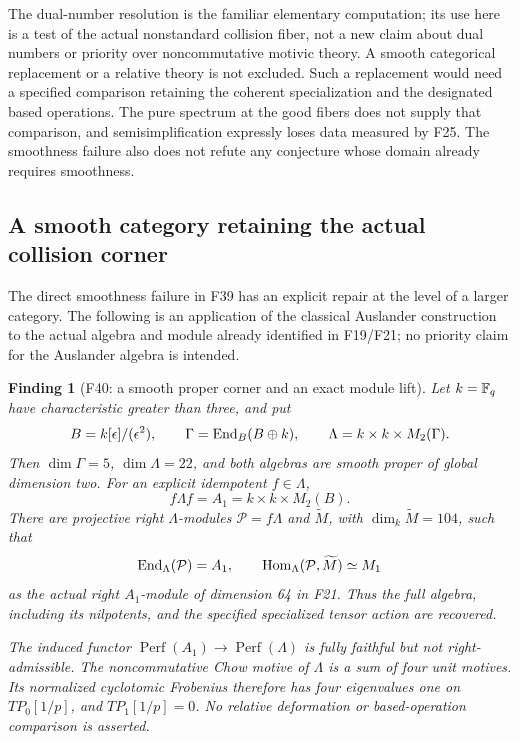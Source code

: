 \documentclass[11pt,a4paper]{article}
\newcommand{\fid}[1]{\textsf{#1}}\newcommand{\gate}[1]{\textsf{#1}}
\theoremstyle{named}\newtheorem{finding}{Finding}[section]
\theoremstyle{definition}\newtheorem{definition}[finding]{Definition}
\theoremstyle{remark}\newtheorem{remark}[finding]{Remark}
\begin{document}
The dual-number resolution is the familiar elementary computation;
its use here is a test of the actual nonstandard collision fiber,
not a new claim about dual numbers or priority over noncommutative
motivic theory. A smooth categorical replacement or a relative theory
is not excluded. Such a replacement would need a specified comparison
retaining the coherent specialization and the designated based
operations. The pure spectrum at the good fibers does not supply
that comparison, and semisimplification expressly loses data measured
by \fid{F25}. The smoothness failure also does not refute any
conjecture whose domain already requires smoothness.

\subsection{A smooth category retaining the actual collision corner}
The direct smoothness failure in \fid{F39} has an explicit repair
at the level of a larger category. The following is an application
of the classical Auslander construction to the actual algebra and
module already identified in \fid{F19}/\fid{F21}; no priority claim
for the Auslander algebra is intended.

\begin{finding}[\fid{F40}: a smooth proper corner and an exact module lift]\label{f:auslander}
Let $k=\mathbb F_q$ have characteristic greater than three, and put
\[
 B=k[\epsilon]/(\epsilon^2),\qquad
 \Gamma=\operatorname{End}_B(B\oplus k),\qquad
 \Lambda=k\times k\times M_2(\Gamma).
\]
Then $\dim\Gamma=5$, $\dim\Lambda=22$, and both algebras are
smooth proper of global dimension two. For an explicit idempotent
$f\in\Lambda$,
\[
 f\Lambda f=A_1=k\times k\times M_2(B).
\]
There are projective right $\Lambda$-modules
$\mathcal P=f\Lambda$ and $\widetilde M$, with
$\dim_k\widetilde M=104$, such that
\[
 \operatorname{End}_\Lambda(\mathcal P)=A_1,\qquad
 \operatorname{Hom}_\Lambda(\mathcal P,\widetilde M)
   \simeq M_1
\]
as the actual right $A_1$-module of dimension 64 in \fid{F21}.
Thus the full algebra, including its nilpotents, and the specified
specialized tensor action are recovered.

The induced functor
$\operatorname{Perf}(A_1)\to\operatorname{Perf}(\Lambda)$ is fully
faithful but not right-admissible. The noncommutative Chow motive
of $\Lambda$ is a sum of four unit motives. Its normalized
cyclotomic Frobenius therefore has four eigenvalues one on
$TP_0[1/p]$, and $TP_1[1/p]=0$.
No relative deformation or based-operation comparison is asserted.
\end{finding}
\end{document}
